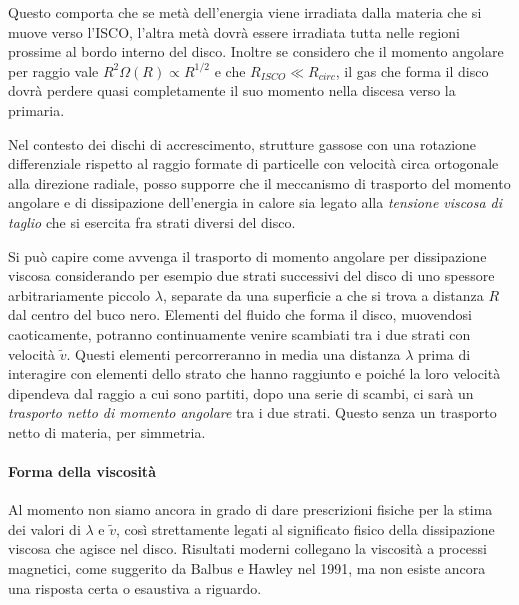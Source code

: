 \documentclass[a4paperbi]{article}
\begin{document}
	Questo comporta che se metà dell'energia viene irradiata dalla materia che si muove verso l'ISCO, l'altra metà dovrà essere irradiata tutta nelle regioni prossime al bordo interno del disco. Inoltre se considero che il momento angolare per raggio vale $R^2\Omega(R)\propto R^{1/2}$ e che $R_{ISCO}\ll R_{circ}$, il gas che forma il disco dovrà perdere quasi completamente il suo momento nella discesa verso la primaria.
	
	Nel contesto dei dischi di accrescimento, strutture gassose con una rotazione differenziale rispetto al raggio formate di particelle con velocità circa ortogonale alla direzione radiale, posso supporre che il meccanismo di trasporto del momento angolare e di dissipazione dell'energia in calore sia legato alla \textit{tensione viscosa di taglio} che si esercita fra strati diversi del disco.
	
	Si può capire come avvenga il trasporto di momento angolare per dissipazione viscosa considerando per esempio due strati successivi del disco di uno spessore arbitrariamente piccolo $\lambda$, separate da una superficie a che si trova a distanza $R$ dal centro del buco nero. Elementi del fluido che forma il disco, muovendosi caoticamente, potranno continuamente venire scambiati tra i due strati con velocità $\tilde{v}$. Questi elementi percorreranno in media una distanza $\lambda$ prima di interagire con elementi dello strato che hanno raggiunto e poiché la loro velocità dipendeva dal raggio a cui sono partiti, dopo una serie di scambi, ci sarà un \textit{trasporto netto di momento angolare} tra i due strati. Questo senza un trasporto netto di materia, per simmetria.
	
	\paragraph{Forma della viscosità}	
	Al momento non siamo ancora in grado di dare prescrizioni fisiche per la stima dei valori di $\lambda$ e $\tilde{v}$, così strettamente legati al significato fisico della dissipazione viscosa che agisce nel disco. Risultati moderni collegano la viscosità a processi magnetici, come suggerito da Balbus e Hawley nel 1991, ma non esiste ancora una risposta certa o esaustiva a riguardo. 
	
\end{document}
